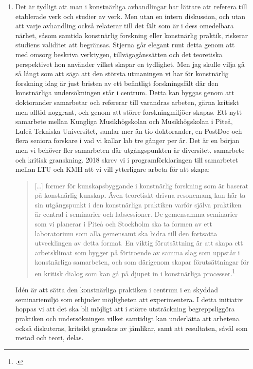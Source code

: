 \documentclass[11pt]{article}
\begin{document}
\begin{enumerate}
  \item Det är tydligt att man i konstnärliga avhandlingar har lättare
    att referera till etablerade verk och studier av verk. Men utan en
    intern diskussion, och utan att varje avhandling också relaterar
    till det fält som är i dess omedelbara närhet, såsom samtida
    konstnärlig forskning eller konstnärlig praktik, riskerar studiens
    validitet att begränsas. Stjerna går elegant runt detta genom att med omsorg
    beskriva verktygen, tillvägagånssätten och det teoretiska
    perspektivet hon använder vilket skapar en tydlighet. Men jag
    skulle vilja gå så långt som att säga att den största utmaningen
    vi har för konstnärlig forskning idag är just bristen av ett
    befintligt forskningsfält där den konstnärliga undersökningen står
    i centrum. Detta kan byggas genom att doktorander samarbetar och
    refererar till varandras arbeten, gärna kritiskt men alltid
    noggrant, och genom att större forskningmiljöer skapas. Ett nytt
    samarbete mellan Kungliga Musikhögskolan och Musikhögskolan i
    Piteå, Luleå Tekniska Universitet, samlar mer än tio doktorander,
    en PostDoc och flera seniora forskare i vad vi kallar lab tre
    gånger per år. Det är en början men vi behöver fler samarbeten där
    utgångspunkten är diversitet, samarbete och kritisk
    granskning. 2018 skrev vi i programförklaringen till samarbetet
    mellan LTU och KMH att vi vill ytterligare arbeta för att skapa:
    \begin{quote} [\ldots] former för kunskapsbyggande i konstnärlig
        forskning som är baserat på konstnärlig kunskap. Även
        teoretiskt drivna resonemang kan här ta sin utgångspunkt i den
        konstnärliga praktiken varför själva praktiken är central i
        seminarier och labsessioner. De gemensamma seminarier som vi
        planerar i Piteå och Stockholm ska ta formen av ett
        laboratorium som alla gemensamt ska bidra till den fortsatta
        utvecklingen av detta format. En viktig förutsättning är att
        skapa ett arbetsklimat som bygger på förtroende av samma slag
        som uppstår i konstnärliga samarbeten, och som därigenom
        skapar förutsättningar för en kritisk dialog som kan gå på
        djupet in i konstnärliga processer.\footcite{frisk2018:irl}
    \end{quote}
    Idén är att sätta den konstnärliga praktiken i centrum i en
    skyddad seminariemiljö som erbjuder möjligheten att
    experimentera. I detta initiativ hoppas vi att det ska bli möjligt
    att i större utsträckning begreppsliggöra praktiken och
    undersökningen vilket samtidigt kan underlätta att arbetena också
    diskuteras, kritsikt granskas av jämlikar, samt att resultaten,
    såväl som metod och teori, delas.


\end{enumerate}
\end{document}
